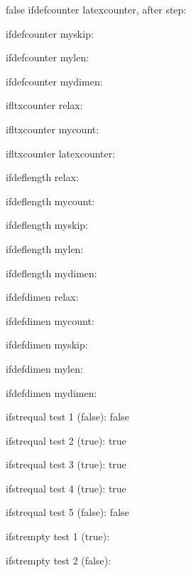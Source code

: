 \documentclass{article}
\begin{document}
\begin{true}{false}
ifdefcounter latexcounter, after step: 

\newskip\myskip
ifdefcounter myskip: 

\newlength\mylen
ifdefcounter mylen: 

\newdimen\mydimen
ifdefcounter mydimen: 

ifltxcounter relax: 

ifltxcounter mycount: 

ifltxcounter latexcounter: 

ifdeflength relax: 

ifdeflength mycount: 

ifdeflength myskip: 

ifdeflength mylen: 

ifdeflength mydimen: 

ifdefdimen relax: 

ifdefdimen mycount: 

ifdefdimen myskip: 

ifdefdimen mylen: 

ifdefdimen mydimen: 


ifstrequal test 1 (false): \ifstrequal{my\relaxing}{\myrelaxing}{true}{false}

ifstrequal test 2 (true): \ifstrequal{my\relaxing}{my\relaxing}{true}{false}

ifstrequal test 3 (true): \ifstrequal{\myrelaxing}{\myrelaxing}{true}{false}

ifstrequal test 4 (true): \ifstrequal{simple}{simple}{true}{false}

ifstrequal test 5 (false): \ifstrequal{simple}{simpler}{true}{false}

ifstrempty test 1 (true): 

ifstrempty test 2 (false): 


\end{true}
\end{document}
